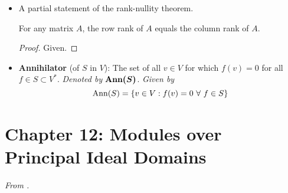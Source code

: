 \documentclass[../notes.tex]{subfiles}
\begin{document}
\begin{itemize}
\begin{theorem}
        \begin{proof}
            Given.
        \end{proof}
    \end{theorem}
    \item A partial statement of the rank-nullity theorem.
    \begin{corollary}\label{cly:11.21}
        For any matrix $A$, the row rank of $A$ equals the column rank of $A$.
        \begin{proof}
            Given.
        \end{proof}
    \end{corollary}
    \item \textbf{Annihilator} (of $S$ in $V$): The set of all $v\in V$ for which $f(v)=0$ for all $f\in S\subset V^*$. \emph{Denoted by} $\bm{\Ann(S)}$. \emph{Given by}
    \begin{equation*}
        \operatorname{Ann}(S) = \{v\in V:f(v)=0\ \forall\ f\in S\}
    \end{equation*}
\end{itemize}
\setcounter{proposition}{0}



\section{Chapter 12: Modules over Principal Ideal Domains}
\emph{From \textcite{bib:DummitFoote}.}
\setcounter{bookch}{12}
\end{document}
